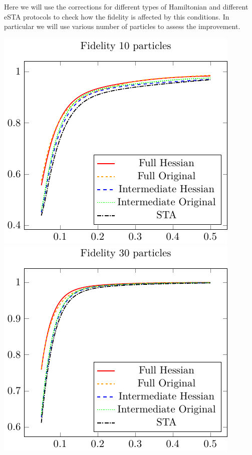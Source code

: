 Here we will use the corrections for different types of Hamiltonian and different eSTA protocols to check how the fidelity is affected by this conditions.
In particular we will use various number of particles to assess the improvement.

\includegraphics{./gfx/fidelity_np10_nlambda5.pdf}
\includegraphics{./gfx/fidelity_np30_nlambda5.pdf}

